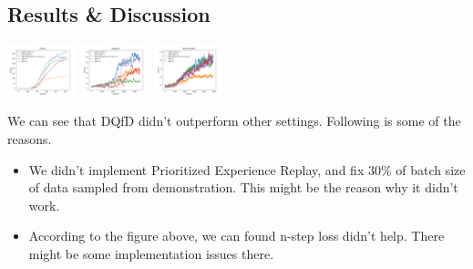 \documentclass[a0,portrait]{a0poster}
\begin{document}
\begin{multicols}{2}


\section*{Results \& Discussion}

\includegraphics[width=0.15\textwidth]{Enduro}
\includegraphics[width=0.15\textwidth]{Seaquest}
\includegraphics[width=0.15\textwidth]{SpaceInvaders}

We can see that DQfD didn't outperform other settings. Following is some of the reasons.

\begin{itemize}
\item We didn't implement Prioritized Experience Replay, and fix 30\% of batch size of data sampled from demonstration. This might be the reason why it didn't work.
\item According to the figure above, we can found n-step loss didn't help. There might be some implementation issues there.
\end{itemize}


\color{DarkSlateGray} %

\nocite{*} %


\end{multicols}
\end{document}
